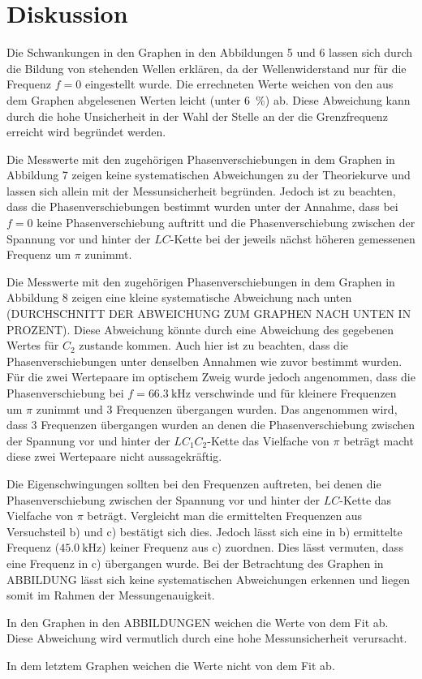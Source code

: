 
\section{Diskussion}
\label{sec:Diskussion}

Die Schwankungen in den Graphen in den Abbildungen 5 und 6 lassen sich durch die Bildung von stehenden Wellen erklären, da der Wellenwiderstand nur für die Frequenz $f=0$ eingestellt wurde. Die errechneten Werte weichen von den aus dem Graphen abgelesenen Werten leicht (unter \SI{6}{\percent}) ab. Diese Abweichung kann durch die hohe Unsicherheit in der Wahl der Stelle an der die Grenzfrequenz erreicht wird begründet werden. 

Die Messwerte mit den zugehörigen Phasenverschiebungen in dem Graphen in Abbildung 7 zeigen keine systematischen Abweichungen zu der Theoriekurve und lassen sich allein mit der Messunsicherheit begründen. Jedoch ist zu beachten, dass die Phasenverschiebungen bestimmt wurden unter der Annahme, dass bei $f=0$ keine Phasenverschiebung auftritt und die Phasenverschiebung zwischen der Spannung vor und hinter der $LC$-Kette bei der jeweils nächst höheren gemessenen Frequenz um $\pi$ zunimmt.

Die Messwerte mit den zugehörigen Phasenverschiebungen in dem Graphen in Abbildung 8 zeigen eine kleine systematische Abweichung nach unten (DURCHSCHNITT DER ABWEICHUNG ZUM GRAPHEN NACH UNTEN IN PROZENT). Diese Abweichung könnte durch eine Abweichung des gegebenen Wertes für $C_2$ zustande kommen. Auch hier ist zu beachten, dass die Phasenverschiebungen unter denselben Annahmen wie zuvor bestimmt wurden. Für die zwei Wertepaare im optischem Zweig wurde jedoch angenommen, dass die Phasenverschiebung bei $f=\SI{66.3}{\kilo\hertz}$ verschwinde und für kleinere Frequenzen um $\pi$ zunimmt und 3 Frequenzen übergangen wurden. Das angenommen wird, dass 3 Frequenzen übergangen wurden an denen die Phasenverschiebung zwischen der Spannung vor und hinter der $LC_1C_2$-Kette das Vielfache von $\pi$ beträgt macht diese zwei Wertepaare nicht aussagekräftig.

Die Eigenschwingungen sollten bei den Frequenzen auftreten, bei denen die Phasenverschiebung zwischen der Spannung vor und hinter der $LC$-Kette das Vielfache von $\pi$ beträgt. Vergleicht man die ermittelten Frequenzen aus Versuchsteil b) und c) bestätigt sich dies. Jedoch lässt sich eine in b) ermittelte Frequenz ($\SI{45.0}{\kilo\hertz}$) keiner Frequenz aus c) zuordnen. Dies lässt vermuten, dass eine Frequenz in c) übergangen wurde.
Bei der Betrachtung des Graphen in ABBILDUNG lässt sich keine systematischen Abweichungen erkennen und liegen somit im Rahmen der Messungenauigkeit.

In den Graphen in den ABBILDUNGEN weichen die Werte von dem Fit ab. Diese Abweichung wird vermutlich durch eine hohe Messunsicherheit verursacht.

In dem letztem Graphen weichen die Werte nicht von dem Fit ab.







	

